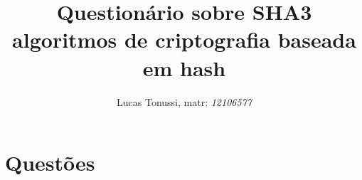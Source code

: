 \documentclass[12pt, a4paper]{article}
\title {
  Questionário sobre SHA3 algoritmos de criptografia baseada em hash
}
\author {
  Lucas Tonussi, matr: \textit{12106577}
}
\begin{document}
\maketitle

%
%
%

\section{Questões}
\end{document}
